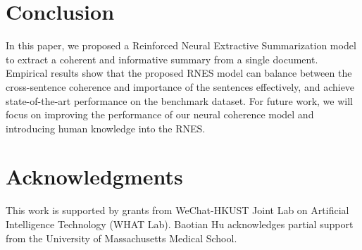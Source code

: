 \documentclass[letterpaper]{article} \usepackage{aaai18}  \usepackage{times}  \usepackage{helvet}  \usepackage{courier}  \usepackage{url}  \usepackage{graphicx}  \usepackage{amssymb}
\begin{document}
	\section{Conclusion}	
	In this paper, we proposed a Reinforced Neural Extractive Summarization model to extract a coherent and informative summary from a single document. Empirical results show that the proposed RNES model can balance between the cross-sentence coherence and importance of the sentences effectively, and achieve state-of-the-art performance on the benchmark dataset. For future work, we will focus on improving the performance of our neural coherence model and introducing human knowledge into the RNES.    
	
	\section*{Acknowledgments}
	This work is supported by grants from WeChat-HKUST Joint Lab on Artificial Intelligence Technology (WHAT Lab). Baotian Hu acknowledges partial support from the University of Massachusetts Medical School.
	
	
	
	
\end{document}
